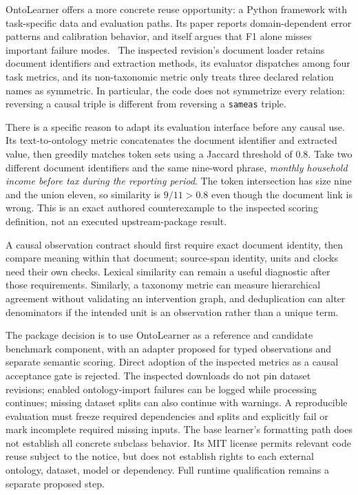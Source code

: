 OntoLearner offers a more concrete reuse opportunity: a Python framework
with task-specific data and evaluation paths. Its paper reports
domain-dependent error patterns and calibration behavior, and itself argues
that F1 alone misses important failure modes.~\citep{v12_la_2607_01977}
The inspected revision's document loader retains document identifiers and
extraction methods, its evaluator dispatches among four task metrics, and
its non-taxonomic metric only treats three declared relation names as
symmetric. In particular, the code does not symmetrize every relation:
reversing a causal triple is different from reversing a
\texttt{sameas} triple.~\citep{exec17_ontology_sources}

There is a specific reason to adapt its evaluation interface before any
causal use. Its text-to-ontology metric concatenates the document identifier
and extracted value, then greedily matches token sets using a Jaccard
threshold of \(0.8\). Take two different document identifiers and the
same nine-word phrase, \emph{monthly household income before tax during the
reporting period}. The token intersection has size nine and the union
eleven, so similarity is \(9/11>0.8\) even though the document link is wrong.
This is an exact authored counterexample to the inspected scoring
definition, not an executed upstream-package result.
\citep{exec17_ontology_sources,exec17_ontology_oracle}

A causal observation contract should first require exact document identity,
then compare meaning within that document; source-span identity, units and
clocks need their own checks. Lexical similarity can remain a useful
diagnostic after those requirements. Similarly, a taxonomy metric can measure
hierarchical agreement without validating an intervention graph, and
deduplication can alter denominators if the intended unit is an observation
rather than a unique term.

The package decision is to use OntoLearner as a reference and candidate
benchmark component, with an adapter proposed for typed observations and
separate semantic scoring. Direct adoption of the inspected metrics as a
causal acceptance gate is rejected. The inspected downloads do not pin
dataset revisions; enabled ontology-import failures can be logged while
processing continues; missing dataset splits can also continue with warnings.
A reproducible evaluation must freeze required dependencies and splits and
explicitly fail or mark incomplete required missing inputs. The base
learner's formatting path does not establish all concrete subclass behavior.
Its MIT license permits relevant code reuse subject to the notice, but does
not establish rights to each external ontology, dataset, model or dependency.
Full runtime qualification remains a separate proposed step.
\citep{exec17_ontology_sources}

